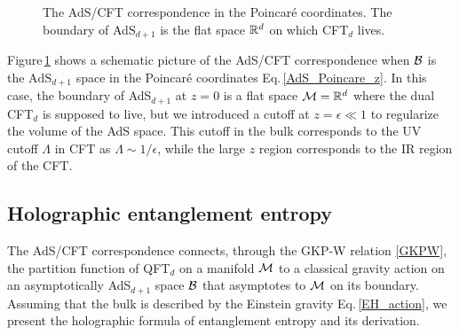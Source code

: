 \begin{figure}[htbp]
\centering
	\caption{The AdS/CFT correspondence in the Poincar{\'e} coordinates. The boundary of AdS$_{d+1}$ is the flat space $\mathbb{R}^d$ on which CFT$_d$ lives.} 
	\label{fig:AdSCFT}
\end{figure}

Figure\,\ref{fig:AdSCFT} shows a schematic picture of the AdS/CFT correspondence when ${\cal B}$ is the $\text{AdS}_{d+1}$ space in the Poincar{\'e} coordinates Eq.\,\eqref{AdS_Poincare_z}.
In this case, the boundary of AdS$_{d+1}$ at $z=0$ is a flat space ${\cal M} = \mathbb{R}^d$ where the dual CFT$_d$ is supposed to live, but we introduced a cutoff at $z=\epsilon \ll 1$ to regularize the volume of the AdS space.
This cutoff in the bulk corresponds to the UV cutoff $\Lambda$ in CFT as $\Lambda \sim 1/\epsilon$, while the large $z$ region corresponds to the IR region of the CFT.



\subsection{Holographic entanglement entropy}\label{ss:HEE}

The AdS/CFT correspondence connects, through the GKP-W relation \eqref{GKPW}, the partition function of QFT$_d$ on a manifold ${\cal M}$ to a classical gravity action on an asymptotically AdS$_{d+1}$ space ${\cal B}$ that asymptotes to ${\cal M}$ on its boundary. 
Assuming that the bulk is described by the Einstein gravity Eq.\,\eqref{EH_action}, we present the holographic formula of entanglement entropy and its derivation.

